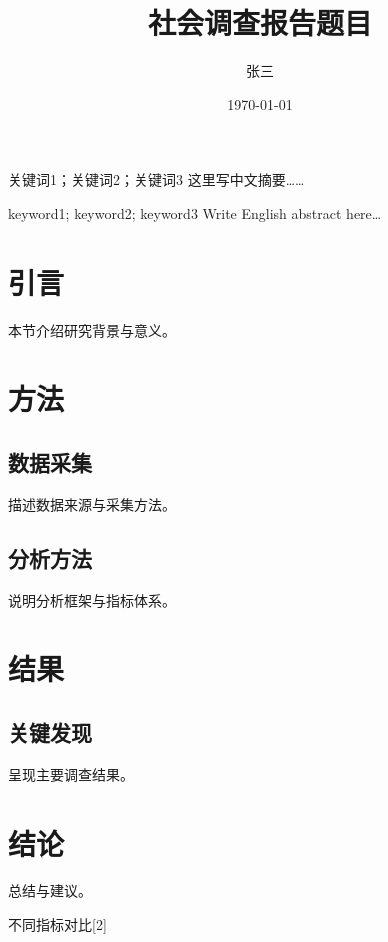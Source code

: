 \documentclass[linux]{hustreport} %
\title{社会调查报告题目}
\author{张三}
\date{\today}
\begin{document}
\makecover
\maketaskbook

\begin{cnabstract}{关键词1；关键词2；关键词3}
这里写中文摘要……
\end{cnabstract}

\begin{enabstract}{keyword1; keyword2; keyword3}
Write English abstract here…
\end{enabstract}

\tableofcontents
\newpage

\section{引言}
本节介绍研究背景与意义。

\section{方法}
\subsection{数据采集}
描述数据来源与采集方法。

\subsection{分析方法}
说明分析框架与指标体系。

\section{结果}
\subsection{关键发现}
呈现主要调查结果。

\section{结论}
总结与建议。

\begin{figurerow}{不同指标对比}[2]
\end{figurerow}
\end{document}
